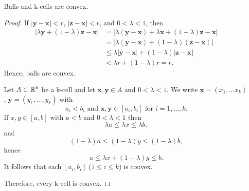 \begin{example}
Balls and k-cells are convex.
\end{example}
\begin{proof}
If $|\mathbf{y}-\mathbf{x}|<r$, $|\mathbf{z}-\mathbf{x}|<r$, and $0<\lambda<1$, then
\begin{align*}
    |\lambda\mathbf{y}+(1-\lambda)\mathbf{z}-\mathbf{x}| &= |\lambda(\mathbf{y}-\mathbf{x})+\lambda\mathbf{x}+(1-\lambda)\mathbf{z}-\mathbf{x}| \\
    &= |\lambda(\mathbf{y}-\mathbf{x})+(1-\lambda)(\mathbf{z}-\mathbf{x})| \\
    &\leq \lambda|\mathbf{y}-\mathbf{x}|+(1-\lambda)|\mathbf{z}-\mathbf{x}| \\
    &< \lambda r + (1-\lambda)r = r.
\end{align*}
Hence, balls are convex.

Let $A \subset \mathbb{R}^k$ be a k-cell and let $\mathbf{x},\mathbf{y} \in A$ and $0<\lambda<1$. 
We write $\mathbf{x}=(x_1, \ldots x_k)$, $\mathbf{y}=(y_1, \ldots, y_k)$ with
\[
a_i<b_i \text{ and } \mathbf{x}, \mathbf{y} \in [a_i,b_i] \text{ for } i=1, \ldots, k.
\]
If $x, y \in [a,b]$ with $a<b$ and $0<\lambda<1$ then
\[
{\lambda}a \leq {\lambda}x \leq {\lambda}b,
\]
and
\[
(1-\lambda)a \leq (1-\lambda)y \leq (1-\lambda)b,
\]
hence 
\[
a \leq {\lambda}x+(1-\lambda)y \leq b.
\]
It follows that each $[a_i, b_i]$ ($1 \leq i \leq k$) is convex.

Therefore, every k-cell is convex.
\end{proof}
